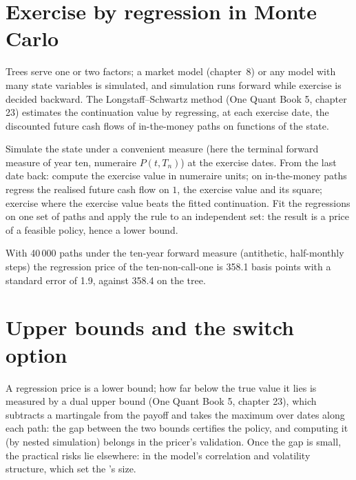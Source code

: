 \section{Exercise by regression in Monte Carlo}

Trees serve one or two factors; a market model (chapter~8) or any model with
many state variables is simulated, and simulation runs forward while exercise is
decided backward. The Longstaff--Schwartz method (One Quant Book 5, chapter 23)
estimates the continuation value by regressing, at each exercise date, the
discounted future cash flows of in-the-money paths on functions of the state.

\begin{method}\label{met:rc:bermudans-and-callables:lsm}
Simulate the state under a convenient measure (here the terminal forward measure
of year ten, numeraire $P(t,T_n)$) at the exercise dates. From the last date back:
compute the exercise value in numeraire units; on in-the-money paths regress the
realised future cash flow on $1$, the exercise value and its square; exercise
where the exercise value beats the fitted continuation. Fit the regressions on one
set of paths and apply the rule to an independent set: the result is a price of a
feasible policy, hence a lower bound.
\end{method}

\label{lst:rc:bermudans-and-callables:lsm}

\begin{example}\label{ex:rc:bermudans-and-callables:lsm}
With 40\,000 paths under the ten-year forward measure (antithetic, half-monthly
steps) the regression price of the ten-non-call-one is 358.1 basis points with a
standard error of 1.9, against 358.4 on the tree.
\end{example}

\section{Upper bounds and the switch option}

A regression price is a lower bound; how far below the true value it lies is
measured by a dual upper bound (One Quant Book 5, chapter 23), which subtracts a
martingale from the payoff and takes the maximum over dates along each path:
the gap between the two bounds certifies the policy, and computing it (by nested
simulation) belongs in the pricer's validation. Once the gap is small, the
practical risks lie elsewhere: in the model's correlation and volatility
structure, which set the 's size.

